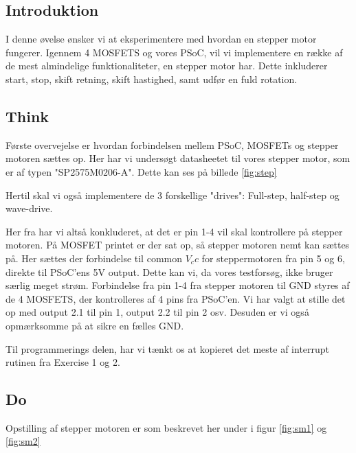 \documentclass[../main.tex]{subfiles}
\begin{document}
\subsection{Introduktion}
I denne øvelse ønsker vi at eksperimentere med hvordan en stepper motor fungerer. Igennem 4 MOSFETS og vores PSoC, vil vi implementere en række af de mest almindelige funktionaliteter, en stepper motor har. Dette inkluderer start, stop, skift retning, skift hastighed, samt udfør en fuld rotation.

\subsection{Think}
Første overvejelse er hvordan forbindelsen mellem PSoC, MOSFETs og stepper motoren sættes op. Her har vi undersøgt datasheetet til vores stepper motor, som er af typen "SP2575M0206-A". Dette kan ses på billede \ref{fig:step}


Hertil skal vi også implementere de 3 forskellige "drives": Full-step, half-step og wave-drive.

Her fra har vi altså konkluderet, at det er pin 1-4 vil skal kontrollere på stepper motoren. På MOSFET printet er der sat op, så stepper motoren nemt kan sættes på. Her sættes der forbindelse til common $V_cc$ for steppermotoren fra pin 5 og 6, direkte til PSoC'ens 5V output. Dette kan vi, da vores testforsøg, ikke bruger særlig meget strøm. Forbindelse fra pin 1-4 fra stepper motoren til GND styres af de 4 MOSFETS, der kontrolleres af 4 pins fra PSoC'en. Vi har valgt at stille det op med output 2.1 til pin 1, output 2.2 til pin 2 osv. Desuden er vi også opmærksomme på at sikre en fælles GND.

Til programmerings delen, har vi tænkt os at kopieret det meste af interrupt rutinen fra Exercise 1 og 2.

\subsection{Do}

Opstilling af stepper motoren er som beskrevet her under i figur \ref{fig:sm1} og \ref{fig:sm2}


\end{document}

